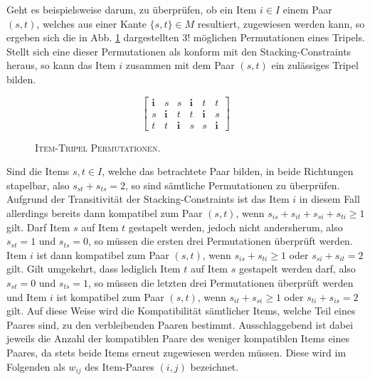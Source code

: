 Geht es beispielsweise darum, zu überprüfen, ob ein Item $i \in I$ einem Paar $(s, t)$, welches aus einer Kante $\{s, t\} \in M$ resultiert,
zugewiesen werden kann, so ergeben sich die in Abb. \ref{fig:triple_permutations} dargestellten $3!$ möglichen Permutationen eines Tripels. Stellt sich eine dieser Permutationen als konform mit den Stacking-Constraints heraus, so kann das Item $i$ zusammen mit dem Paar $(s, t)$ ein zulässiges Tripel bilden.
\begin{figure}[H]
\[
\begin{bmatrix}
  \boldsymbol{i} & s & s & \boldsymbol{i} & t & t \\
  s & \boldsymbol{i} & t & t & \boldsymbol{i} & s \\
  t & t & \boldsymbol{i} & s & s & \boldsymbol{i}
\end{bmatrix}
\]
\caption{\textsc{Item-Tripel Permutationen.}}
\label{fig:triple_permutations}
\end{figure}
Sind die Items $s, t \in I$, welche das betrachtete Paar bilden, in beide Richtungen stapelbar, also
$s_{st} + s_{ts} = 2$, so sind sämtliche Permutationen zu überprüfen.
Aufgrund der Transitivität der Stacking-Constraints ist das Item $i$ in diesem Fall allerdings bereits dann kompatibel zum Paar $(s, t)$,
wenn $s_{is} + s_{it} + s_{si} + s_{ti} \geq 1$ gilt.
Darf Item $s$ auf Item $t$ gestapelt werden, jedoch nicht andersherum, also $s_{st} = 1$ und $s_{ts} = 0$,
so müssen die ersten drei Permutationen überprüft werden. Item $i$ ist dann kompatibel zum Paar $(s, t)$,
wenn $s_{is} + s_{ti} \geq 1$ oder $s_{si} + s_{it} = 2$ gilt.
Gilt umgekehrt, dass lediglich Item $t$ auf Item $s$ gestapelt werden darf, also $s_{st} = 0$ und $s_{ts} = 1$, so
müssen die letzten drei Permutationen überprüft werden und Item $i$ ist kompatibel zum Paar $(s, t)$,
wenn $s_{it} + s_{si} \geq 1$ oder $s_{ti} + s_{is} = 2$ gilt.\newline
Auf diese Weise wird die Kompatibilität sämtlicher Items, welche Teil eines Paares sind, zu den verbleibenden Paaren bestimmt.
Ausschlaggebend ist dabei jeweils die Anzahl der kompatiblen Paare des weniger kompatiblen Items eines Paares,
da stets beide Items erneut zugewiesen werden müssen. Diese wird im Folgenden als 
$w_{ij}$ des Item-Paares $(i, j)$ bezeichnet.

